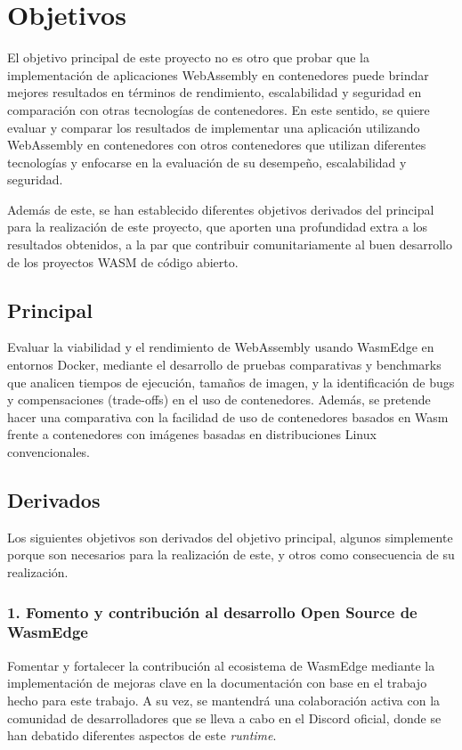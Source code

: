  
\section{Objetivos}

El objetivo principal de este proyecto no es otro que probar que la implementación de aplicaciones WebAssembly en contenedores puede brindar mejores resultados en términos de rendimiento, escalabilidad y seguridad en comparación con otras tecnologías de contenedores. En este sentido, se quiere evaluar y comparar los resultados de implementar una aplicación utilizando WebAssembly en contenedores con otros contenedores que utilizan diferentes tecnologías y enfocarse en la evaluación de su desempeño, escalabilidad y seguridad.

Además de este, se han establecido diferentes objetivos derivados del principal para la realización de este proyecto, que aporten una profundidad extra a los resultados obtenidos, a la par que contribuir comunitariamente al buen desarrollo de los proyectos WASM de código abierto.

\subsection{Principal}

Evaluar la viabilidad y el rendimiento de WebAssembly usando WasmEdge en entornos Docker, mediante el desarrollo de pruebas comparativas y benchmarks que analicen tiempos de ejecución, tamaños de imagen, y la identificación de bugs y compensaciones (trade-offs) en el uso de contenedores. Además, se pretende hacer una comparativa con la facilidad de uso de contenedores basados en Wasm frente a contenedores con imágenes basadas en distribuciones Linux convencionales.

\subsection{Derivados}

Los siguientes objetivos son derivados del objetivo principal, algunos simplemente porque son necesarios para la realización de este, y otros como consecuencia de su realización.

\subsubsection{1. Fomento y contribución al desarrollo Open Source de WasmEdge}

Fomentar y fortalecer la contribución al ecosistema de WasmEdge mediante la implementación de mejoras clave en la documentación con base en el trabajo hecho para este trabajo. A su vez, se mantendrá una colaboración activa con la comunidad de desarrolladores que se lleva a cabo en el Discord oficial, donde se han debatido diferentes aspectos de este \textit{runtime}.

